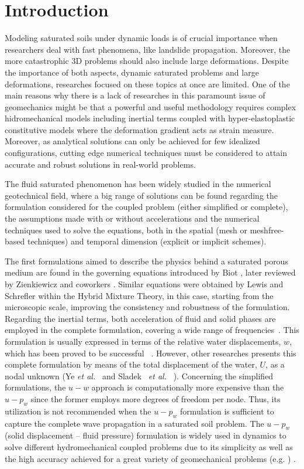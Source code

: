 \documentclass[twocolumn]{svjour3}          %
\newcommand{\etal}{
  \textit{et al.}
}
\begin{document}
\section{Introduction}
\label{intro}

Modeling saturated soils under dynamic loads is of crucial importance when researchers deal with fast phenomena, like landslide propagation. Moreover, the more catastrophic 3D problems should also include large deformations. Despite the importance of both aspects, dynamic saturated problems and large deformations, researches focused on these topics at once are limited. One of the main reasons why there is a lack of researches in this paramount issue of geomechanics might be that a powerful and useful methodology requires complex hidromechanical models including inertial terms coupled with hyper-elastoplastic constitutive models where the deformation gradient acts as strain measure. Moreover, as analytical solutions can only be achieved for few idealized configurations, cutting edge numerical techniques must be considered to attain accurate and robust solutions in real-world problems.

The fluid saturated phenomenon has been widely studied in the numerical geotechnical field, where a big range of solutions can be found regarding the formulation considered for the coupled problem (either simplified or complete), the assumptions made with or without accelerations and the numerical techniques used to solve the equations, both in the spatial (mesh or meshfree-based techniques) and temporal dimension (explicit or implicit schemes). 

The first formulations aimed to describe the physics behind a saturated porous medium are found in the governing equations introduced by Biot \cite{Biot1956}, later reviewed by Zienkiewicz and coworkers \cite{Zienkiewicz99,zienkiewicz1980,zienkiewicz1984,zienkiewicz1990a}. Similar equations were obtained by Lewis and Schrefler \cite{LewisSchrefler98} within the Hybrid Mixture Theory, in this case, starting from the microscopic scale, improving the consistency and robustness of the formulation. Regarding the inertial terms, both acceleration of fluid and solid phases are employed in the complete formulation, covering a wide range of frequencies~\cite{Jeremic08,Muraleetharan09}. This formulation is usually expressed in terms of the relative water displacements, $w$, which has been proved to be successful ~\cite{LopezQuerolB2006,Navas2016}. However, other researches presents this complete formulation by means of the total displacement of the water, $U$, as a nodal unknown (Ye {\it et al.}~\cite{Ye2014} and Sladek~\etal~\cite{Sladek2014}). Concerning the simplified formulations, the $u-w$ approach is computationally more expensive than the $u-p_w$ since the former employs more degrees of freedom per node. Thus, its utilization is not recommended when the $u-p_w$ formulation is sufficient to capture the complete wave propagation in a saturated soil problem. 
The $u-p_w$ (solid displacement -- fluid pressure) formulation is widely used in dynamics to solve different hydromechanical coupled problems due to its simplicity as well as the high accuracy achieved for a great variety of geomechanical problems (e.g. \cite{CaoSanavia:16,zienkiewicz1990a,Zienkiewicz99}) . 
\end{document}

